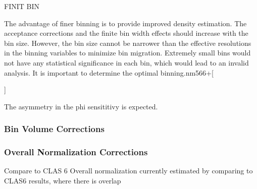     FINIT BIN

    The advantage of finer binning is to provide improved density estimation. The
acceptance corrections and the finite bin width effects should increase with the bin
size. However, the bin size cannot be narrower than the effective resolutions in the
binning variables to minimize bin migration. Extremely small bins would not have
any statistical significance in each bin, which would lead to an invalid analysis. It is
important to determine the optimal binning.nm566+[



]
    

    The asymmetry in the phi sensititivy is expected. 
    
    
    \subsubsection*{Bin Volume Corrections}
        
    
    \subsubsection*{Overall Normalization Corrections}
        Compare to CLAS 6
        Overall normalization currently estimated by comparing to CLAS6 results, where there is overlap
    \fi

